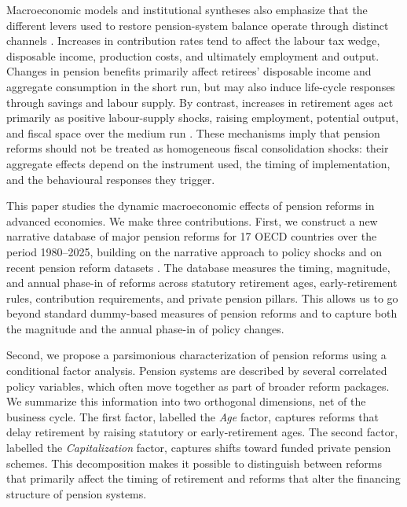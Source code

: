 \documentclass[11pt,english,a4paper, twoside, authoryear]{article}
\begin{document}
Macroeconomic models and institutional syntheses also emphasize that the different levers used to restore pension-system balance operate through distinct channels \citep{COR2026MacroLeviers}. Increases in contribution rates tend to affect the labour tax wedge, disposable income, production costs, and ultimately employment and output. Changes in pension benefits primarily affect retirees' disposable income and aggregate consumption in the short run, but may also induce life-cycle responses through savings and labour supply. By contrast, increases in retirement ages act primarily as positive labour-supply shocks, raising employment, potential output, and fiscal space over the medium run \citep{HvidingMerette1998, KaramMuirPereiraTuladhar2010, Morgavi2024, COR2026MacroLeviers}. These mechanisms imply that pension reforms should not be treated as homogeneous fiscal consolidation shocks: their aggregate effects depend on the instrument used, the timing of implementation, and the behavioural responses they trigger.

This paper studies the dynamic macroeconomic effects of pension reforms in advanced economies. We make three contributions. First, we construct a new narrative database of major pension reforms for 17 OECD countries over the period 1980--2025, building on the narrative approach to policy shocks and on recent pension reform datasets \citep{Ramey2009, RomerRomer2010, Beetsma2020, BiZubairy2023, romp_political_2024}. The database measures the timing, magnitude, and annual phase-in of reforms across statutory retirement ages, early-retirement rules, contribution requirements, and private pension pillars. This allows us to go beyond standard dummy-based measures of pension reforms and to capture both the magnitude and the annual phase-in of policy changes.

Second, we propose a parsimonious characterization of pension reforms using a conditional factor analysis. Pension systems are described by several correlated policy variables, which often move together as part of broader reform packages. We summarize this information into two orthogonal dimensions, net of the business cycle. The first factor, labelled the \emph{Age} factor, captures reforms that delay retirement by raising statutory or early-retirement ages. The second factor, labelled the \emph{Capitalization} factor, captures shifts toward funded private pension schemes. This decomposition makes it possible to distinguish between reforms that primarily affect the timing of retirement and reforms that alter the financing structure of pension systems.
\end{document}
